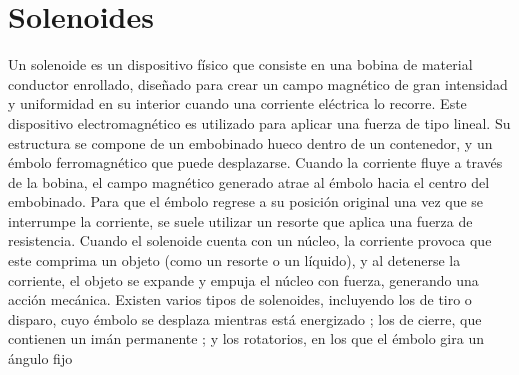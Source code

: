 \documentclass[11pt]{scrartcl}
\begin{document}
\section{Solenoides}
Un solenoide es un dispositivo físico que consiste en una bobina de material conductor enrollado, diseñado para crear un campo magnético de gran intensidad y uniformidad en su interior cuando una corriente eléctrica lo recorre. Este dispositivo electromagnético es utilizado para aplicar una fuerza de tipo lineal. Su estructura se compone de un embobinado hueco dentro de un contenedor, y un émbolo ferromagnético que puede desplazarse. Cuando la corriente fluye a través de la bobina, el campo magnético generado atrae al émbolo hacia el centro del embobinado. Para que el émbolo regrese a su posición original una vez que se interrumpe la corriente, se suele utilizar un resorte que aplica una fuerza de resistencia. Cuando el solenoide cuenta con un núcleo, la corriente provoca que este comprima un objeto (como un resorte o un líquido), y al detenerse la corriente, el objeto se expande y empuja el núcleo con fuerza, generando una acción mecánica. Existen varios tipos de solenoides, incluyendo los de tiro o disparo, cuyo émbolo se desplaza mientras está energizado ; los de cierre, que contienen un imán permanente ; y los rotatorios, en los que el émbolo gira un ángulo fijo
\end{document}
